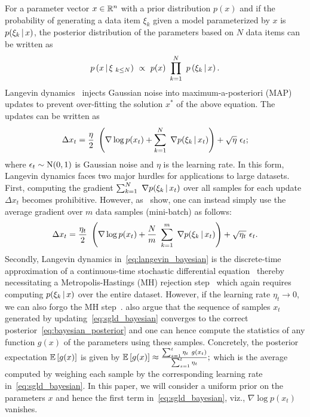 \documentclass[10pt]{article}
\begin{document}
\begin{appendices}
For a parameter vector $x \in \mathbb{R}^n$ with a prior distribution $p(x)$ and if the probability of generating a data item $\xi_k$ given a model parameterized by $x$ is $p(\xi_k \, \vert \, x)$, the posterior distribution of the parameters based on $N$ data items can be written as
\begin{equation}
    p\left(x \, \vert \, \xi_{\ k \leq N}\right)\ \propto\ p(x)\ \prod_{k=1}^N\ p\left(\xi_k \, \vert \, x\right).
    \label{eq:bayesian_posterior}
\end{equation}
Langevin dynamics~\citep{neal2011mcmc} injects Gaussian noise into maximum-a-posteriori (MAP) updates to prevent over-fitting the solution $x^*$ of the above equation. The updates can be written as
\begin{equation}
    \Delta x_t = \frac{\eta}{2}\ \left( \nabla \log p(x_t) + \sum_{k=1}^N\ \nabla p(\xi_k \, \vert \, x_t)\right) + \sqrt{\eta}\ \epsilon_t;
    \label{eq:langevin_bayesian}
\end{equation}
where $\epsilon_t \sim \mathrm{N}(0, 1)$ is Gaussian noise and $\eta$ is the learning rate. In this form, Langevin dynamics faces two major hurdles for applications to large datasets. First, computing the gradient $\sum_{k=1}^N\ \nabla p(\xi_k \, \vert \, x_t)$ over all samples for each update $\Delta x_t$ becomes prohibitive. However, as~\citet{welling2011bayesian} show, one can instead simply use the average gradient over $m$ data samples (mini-batch) as follows:
\begin{equation}
    \Delta x_t = \frac{\eta_t}{2}\ \left( \nabla \log p(x_t) + \frac{N}{m}\ \sum_{k=1}^m\ \nabla p(\xi_k \, \vert \, x_t)\right) + \sqrt{\eta_t}\ \epsilon_t.
    \label{eq:sgld_bayesian}
\end{equation}
Secondly, Langevin dynamics in~\eqref{eq:langevin_bayesian} is the discrete-time approximation of a continuous-time stochastic differential equation~\citep{mandt2016variational} thereby necessitating a Metropolis-Hastings (MH) rejection step~\citep{roberts2002langevin} which again requires computing $p(\xi_k \, \vert \, x)$ over the entire dataset. However, if the learning rate $\eta_t \to 0$, we can also forgo the MH step~\citep{chen2014stochastic}. \citet{welling2011bayesian} also argue that the sequence of samples $x_t$ generated by updating~\eqref{eq:sgld_bayesian} converges to the correct posterior~\eqref{eq:bayesian_posterior} and one can hence compute the statistics of any function $g(x)$ of the parameters using these samples. Concretely, the posterior expectation $\mathbb{E}\left[g(x)\right]$ is given by
$
    \mathbb{E}\left[g(x)\right] \approx \frac{\sum_{s=1}^t \eta_t\ g(x_t)}{\sum_{s=1}^t \eta_t};
$
which is the average computed by weighing each sample by the corresponding learning rate in~\eqref{eq:sgld_bayesian}. In this paper, we will consider a uniform prior on the parameters $x$ and hence the first term in~\eqref{eq:sgld_bayesian}, viz., $\nabla \log p(x_t)$ vanishes.


\end{appendices}
\end{document}
